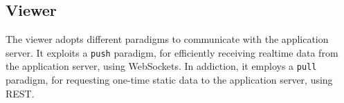 \subsection{Viewer}
The viewer adopts different paradigms to communicate with the application server.
It exploits a \texttt{push} paradigm, for efficiently receiving realtime data from the application server, using WebSockets.
In addiction, it employs a \texttt{pull} paradigm, for requesting one-time static data to the application server, using REST.